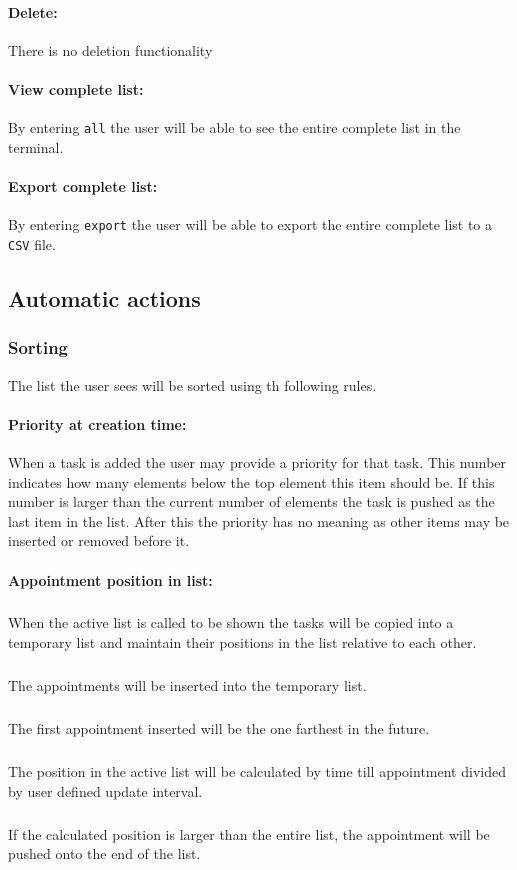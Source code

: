 \documentclass[12pt]{article}
\newcommand{\e}[1] {{\tt #1}}
\begin{document}
\paragraph{Delete:} \label{sec:Delete} There is no deletion functionality
\paragraph{View complete list:} \label{sec:View complete list} By entering \e{all} the user will be able to see the entire complete list in the terminal.
\paragraph{Export complete list:} \label{sec:Export complete list} By entering \e{export} the user will be able to export the entire complete list to a \e{CSV} file.
\subsection{Automatic actions}
\subsubsection{Sorting} \label{sec:Sorting}
The list the user sees will be sorted using th following rules.
\paragraph{Priority at creation time:} \label{sec:Sorting - Priority} When a task is added the user may provide a priority for that task. This number indicates how many elements below the top element this item should be. If this number is larger than the current number of elements the task is pushed as the last item in the list. After this the priority has no meaning as other items may be inserted or removed before it.
\paragraph{Appointment position in list:} \label{sec:Sorting - Appointment} 
\subparagraph{}When the active list is called to be shown the tasks will be copied into a temporary list and maintain their positions in the list relative to each other. 
\subparagraph{}The appointments will be inserted into the temporary list. 
\subparagraph{}The first appointment inserted will be the one farthest in the future. 
\subparagraph{}The position in the active list will be calculated by time till appointment divided by user defined update interval. 
\subparagraph{}If the calculated position is larger than the entire list, the appointment will be pushed onto the end of the list.
\end{document}
